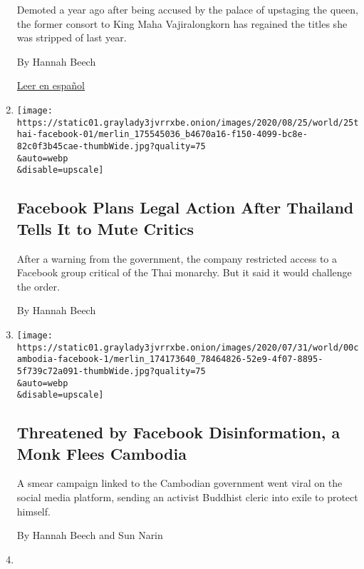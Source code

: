 \begin{enumerate}
  Demoted a year ago after being accused by the palace of upstaging the
  queen, the former consort to King Maha Vajiralongkorn has regained the
  titles she was stripped of last year.

  By Hannah Beech

  \href{https://www.nytimes3xbfgragh.onion/es/2020/09/02/espanol/mundo/consorte-real-tailandia.html}{Leer
  en español}
\item
  \href{/2020/08/25/world/asia/thailand-facebook-monarchy.html}{}

  \texttt{[image: https://static01.graylady3jvrrxbe.onion/images/2020/08/25/world/25thai-facebook-01/merlin\_175545036\_b4670a16-f150-4099-bc8e-82c0f3b45cae-thumbWide.jpg?quality=75\\\&auto=webp\\\&disable=upscale]}

  \hypertarget{facebook-plans-legal-action-after-thailand-tells-it-to-mute-critics}{%
  \subsection{Facebook Plans Legal Action After Thailand Tells It to
  Mute
  Critics}\label{facebook-plans-legal-action-after-thailand-tells-it-to-mute-critics}}

  After a warning from the government, the company restricted access to
  a Facebook group critical of the Thai monarchy. But it said it would
  challenge the order.

  By Hannah Beech
\item
  \href{/2020/08/23/world/asia/cambodia-facebook-disinformation.html}{}

  \texttt{[image: https://static01.graylady3jvrrxbe.onion/images/2020/07/31/world/00cambodia-facebook-1/merlin\_174173640\_78464826-52e9-4f07-8895-5f739c72a091-thumbWide.jpg?quality=75\\\&auto=webp\\\&disable=upscale]}

  \hypertarget{threatened-by-facebook-disinformation-a-monk-flees-cambodia}{%
  \subsection{Threatened by Facebook Disinformation, a Monk Flees
  Cambodia}\label{threatened-by-facebook-disinformation-a-monk-flees-cambodia}}

  A smear campaign linked to the Cambodian government went viral on the
  social media platform, sending an activist Buddhist cleric into exile
  to protect himself.

  By Hannah Beech and Sun Narin
\item
  \href{/2020/08/20/world/asia/thailand-arrests-protests.html}{}


\end{enumerate}
